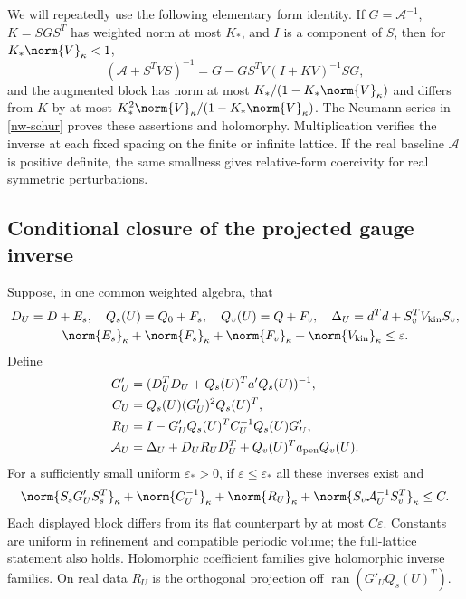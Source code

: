 We will repeatedly use the following elementary form identity.
If $G=\mathcal A^{-1}$, $K=SGS^T$ has weighted norm at most $K_*$,
and $I$ is a component of $S$, then for $K_*\norm{V}_\kappa<1$,
\begin{equation}\label{nw-form-resolvent}
 (\mathcal A+S^TVS)^{-1}
 =G-GS^TV(I+KV)^{-1}SG,
\end{equation}
and the augmented block has norm at most
$K_* /(1-K_*\norm{V}_\kappa)$ and differs from $K$ by at most
$K_*^2\norm{V}_\kappa/(1-K_*\norm{V}_\kappa)$.
The Neumann series in \eqref{nw-schur} proves these assertions and
holomorphy. Multiplication verifies the inverse at each fixed
spacing on the finite or infinite lattice. If the real baseline
$\mathcal A$ is positive definite, the same smallness gives
relative-form coercivity for real symmetric perturbations.

\subsection{Conditional closure of the projected gauge inverse}
\label{nw-conditional}

\begin{theorem}\label{nw-energy-theorem}
Suppose, in one common weighted algebra, that
\begin{gather}
 D_U=D+E_s,\quad Q_s(U)=Q_0+F_s,\quad Q_v(U)=Q+F_v,
 \quad \Delta_U=d^Td+S_v^TV_{\rm kin}S_v,\nonumber\\
 \norm{E_s}_\kappa+\norm{F_s}_\kappa+
 \norm{F_v}_\kappa+\norm{V_{\rm kin}}_\kappa\le\varepsilon.
                                                        \label{nw-hypotheses}
\end{gather}
Define
\begin{align}
 G'_U&=(D_U^TD_U+Q_s(U)^Ta'Q_s(U))^{-1},\nonumber\\
 C_U&=Q_s(U)(G'_U)^2Q_s(U)^T,\nonumber\\
 R_U&=I-G'_UQ_s(U)^TC_U^{-1}Q_s(U)G'_U,\nonumber\\
 \mathcal A_U&=\Delta_U+D_UR_UD_U^T
                     +Q_v(U)^Ta_{\rm pen}Q_v(U).       \label{nw-full-operator}
\end{align}
For a sufficiently small uniform $\varepsilon_*>0$, if
$\varepsilon\le\varepsilon_*$ all these inverses exist and
\begin{equation}\label{nw-energy-bound}
 \norm{S_sG'_US_s^T}_\kappa+
 \norm{C_U^{-1}}_\kappa+\norm{R_U}_\kappa+
 \norm{S_v\mathcal A_U^{-1}S_v^T}_\kappa\le C.
\end{equation}
Each displayed block differs from its flat counterpart by at
most $C\varepsilon$. Constants are uniform in refinement and
compatible periodic volume; the full-lattice statement also holds.
Holomorphic coefficient families give holomorphic inverse families.
On real data $R_U$ is the orthogonal projection off
$\operatorname{ran}(G'_UQ_s(U)^T)$.
\end{theorem}


